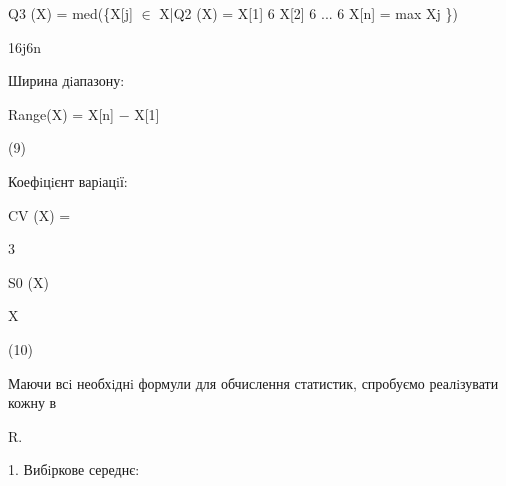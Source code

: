 \documentclass[a4paper,portrait,12pt]{article}
\begin{document}
\begin{flushleft}
Q3 (X) = med(\{X[j] $\in$ X|Q2 (X) = X[1] 6 X[2] 6 ... 6 X[n] = max Xj \})
\end{flushleft}


\begin{flushleft}
16j6n
\end{flushleft}





\begin{flushleft}
Ширина дiапазону:
\end{flushleft}


\begin{flushleft}
Range(X) = X[n] $-$ X[1]
\end{flushleft}





(9)





\begin{flushleft}
Коефiцiєнт варiацiї:
\end{flushleft}


\begin{flushleft}
CV (X) =
\end{flushleft}





3





\begin{flushleft}
S0 (X)
\end{flushleft}


\begin{flushleft}
X
\end{flushleft}





(10)





\begin{flushleft}
\newpage
Маючи всi необхiднi формули для обчислення статистик, спробуємо реалiзувати кожну в
\end{flushleft}


\begin{flushleft}
R.
\end{flushleft}


\begin{flushleft}
1. Вибiркове середнє:
\end{flushleft}
\end{document}
